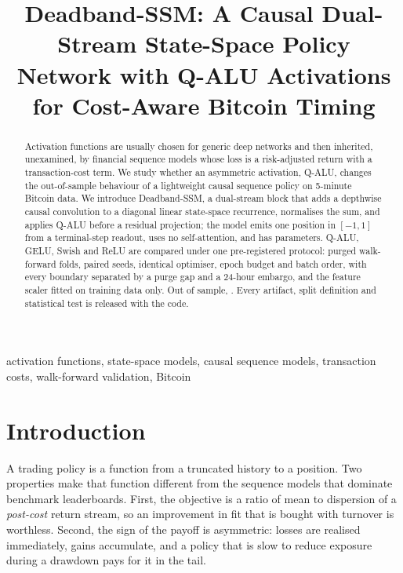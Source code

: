 \documentclass[conference]{IEEEtran}
\begin{document}
\title{Deadband-SSM: A Causal Dual-Stream State-Space Policy Network with
Q-ALU Activations for Cost-Aware Bitcoin Timing}

\author{
}

\maketitle

\begin{abstract}
Activation functions are usually chosen for generic deep networks and then
inherited, unexamined, by financial sequence models whose loss is a
risk-adjusted return with a transaction-cost term. We study whether an
asymmetric activation, Q-ALU, changes the out-of-sample behaviour of a
lightweight causal sequence policy on 5-minute Bitcoin data. We introduce
Deadband-SSM, a dual-stream block that adds a depthwise causal convolution to a
diagonal linear state-space recurrence, normalises the sum, and applies Q-ALU
before a residual projection; the model emits one position in $[-1,1]$ from a
terminal-step readout, uses no self-attention, and has \paramCount{}
parameters. Q-ALU, GELU, Swish and ReLU are compared under one pre-registered
protocol: \nFolds{} purged walk-forward folds, \nSeeds{} paired seeds, identical
optimiser, epoch budget and batch order, with every boundary separated by a
purge gap and a 24-hour embargo, and the feature scaler fitted on training data
only. Out of sample, \resultSentence{}. Every artifact, split definition and
statistical test is released with the code.
\end{abstract}

\begin{IEEEkeywords}
activation functions, state-space models, causal sequence models, transaction
costs, walk-forward validation, Bitcoin
\end{IEEEkeywords}

\section{Introduction}

A trading policy is a function from a truncated history to a position. Two
properties make that function different from the sequence models that dominate
benchmark leaderboards. First, the objective is a ratio of mean to dispersion
of a \emph{post-cost} return stream, so an improvement in fit that is bought
with turnover is worthless. Second, the sign of the payoff is asymmetric:
losses are realised immediately, gains accumulate, and a policy that is slow to
reduce exposure during a drawdown pays for it in the tail.
\end{document}
